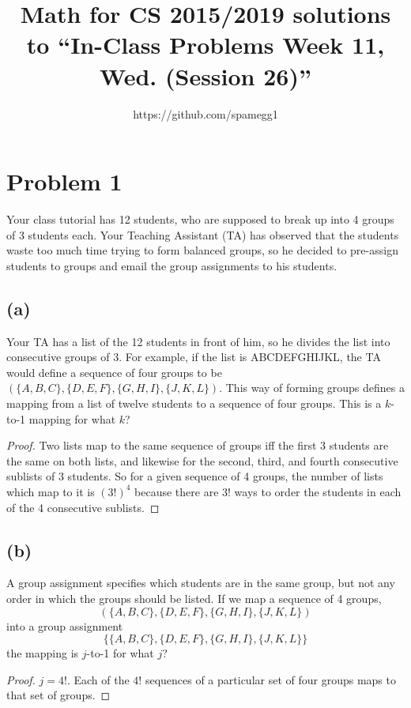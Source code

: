\documentclass[14pt]{extarticle}
\title{Math for CS 2015/2019 solutions to ``In-Class Problems Week 11, Wed. (Session 26)''}
\author{https://github.com/spamegg1}
\begin{document}
\maketitle
\tableofcontents

\section{Problem 1}
Your class tutorial has 12 students, who are supposed to break up into 4 groups of 3 students each. Your Teaching Assistant (TA) has observed that the students waste too much time trying to form balanced groups, so he decided to pre-assign students to groups and email the group assignments to his students.

\subsection{(a)}
Your TA has a list of the 12 students in front of him, so he divides the list into consecutive groups of 3. For example, if the list is ABCDEFGHIJKL, the TA would define a sequence of four groups to be $(\{A,B,C\},\{D,E,F\},\{G,H,I\},\{J,K,L\})$. This way of forming groups defines a mapping from a list of twelve students to a sequence of four groups. This is a $k$-to-1 mapping for what $k$?
\begin{proof}
Two lists map to the same sequence of groups iff the first 3 students are the same on both lists, and likewise for the second, third, and fourth consecutive sublists of 3 students. So for a given sequence of 4 groups, the number of lists which map to it is
$(3!)^4$ because there are $3!$ ways to order the students in each of the 4 consecutive sublists.
\end{proof}

\subsection{(b)}
A group assignment specifies which students are in the same group, but not any order in which the groups should be listed. If we map a sequence of 4 groups,
$$
(\{A,B,C\},\{D,E,F\},\{G,H,I\},\{J,K,L\})
$$
into a group assignment
$$
\{\{A,B,C\},\{D,E,F\},\{G,H,I\},\{J,K,L\}\}
$$
the mapping is $j$-to-1 for what $j$?
\begin{proof}
$j = 4!$. Each of the $4!$ sequences of a particular set of four groups maps to that set of groups.
\end{proof}
\end{document}
